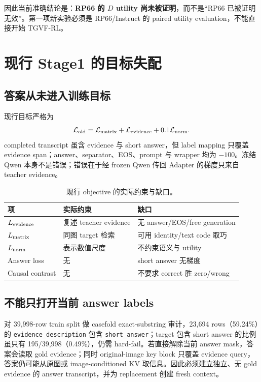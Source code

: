 \documentclass[UTF8,twocolumn,10pt,a4paper]{ctexart}
\newcommand{\code}[1]{\texttt{#1}}
\begin{document}
因此当前准确结论是：\textbf{RP66 的 $D$ utility 尚未被证明}，而不是“RP66 已被证明无效”。第一项新实验必须是 RP66/Instruct 的 paired utility evaluation，不能直接开始 TGVF-RL。

\section{现行 Stage1 的目标失配}

\subsection{答案从未进入训练目标}

现行目标严格为
\begin{equation}
 \mathcal L_{\rm old}=\mathcal L_{\rm matrix}
 +\mathcal L_{\rm evidence}+0.1\mathcal L_{\rm norm}.
 \label{eq:old-loss}
\end{equation}
completed transcript 虽含 evidence 与 short answer，但 label mapping 只覆盖 evidence span；answer、separator、EOS、prompt 与 wrapper 均为 $-100$。冻结 Qwen 本身不是错误；错误在于经 frozen Qwen 传回 Adapter 的梯度只来自 teacher evidence。

\begin{table}[t]
\centering
\caption{现行 objective 的实际约束与缺口。}
\label{tab:old-objective}
\small
\begin{tabularx}{\columnwidth}{lYY}
\toprule
项 & 实际约束 & 缺口 \\
\midrule
$L_{\rm evidence}$ & 复述 teacher evidence & 无 answer/EOS/free generation \\
$L_{\rm matrix}$ & 同图 target 检索 & 可用 identity/text code 取巧 \\
$L_{\rm norm}$ & 表示数值尺度 & 不约束语义与 utility \\
Answer loss & 无 & short answer 无梯度 \\
Causal contrast & 无 & 不要求 correct 胜 zero/wrong \\
\bottomrule
\end{tabularx}
\end{table}

\subsection{不能只打开当前 answer labels}

对 39,998-row train split 做 casefold exact-substring 审计，23,694 rows（59.24\%）的 \code{evidence\_description} 包含 \code{short\_answer}；target 包含 short answer 的比例虽只有 195/39,998（0.49\%），仍需 hard-fail。若直接解除当前 answer mask，答案会读取 gold evidence；同时 original-image key block 只覆盖 evidence query，答案仍可能从原图或 image-conditioned KV 取信息。因此必须建立独立、无 gold evidence 的 answer transcript，并为 replacement 创建 fresh context。
\end{document}
